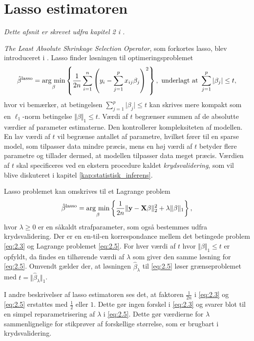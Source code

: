 \section{Lasso estimatoren} \label{sec:lasso_estimatoren}
\textit{Dette afsnit er skrevet udfra kapitel 2 i \citep{hastie}.}

\textit{The Least Absolute Shrinkage Selection Operator}, som forkortes lasso, blev introduceret i \citep{lasso}. 
Lasso finder løsningen til optimeringsproblemet
\begin{align}
\hat{\beta}^\text{lasso} = \argmin_{\beta} \cbr{\frac{1}{2n} \sum_{i=1}^n \del{y_i - \sum_{j=1}^p x_{ij} \beta_j}^2}, \ \text{underlagt at } \sum_{j=1}^p \vert \beta_j \vert \leq t, \label{eq:2.3}
\end{align} 
hvor vi bemærker, at betingelsen $\sum_{j=1}^p \vert \beta_j \vert \leq t$ kan skrives mere kompakt som en \(\ell_1\)-norm betingelse $\Vert \beta \Vert_1 \leq t$.
Værdi af \(t\) begrænser summen af de absolutte værdier af parameter estimaterne.
Den kontrollerer kompleksiteten af modellen. 
En lav værdi af \(t\) vil begrænse antallet af parametre, hvilket fører til en sparse model, som tilpasser data mindre præcis, mens en høj værdi af \(t\) betyder flere parametre og tillader dermed, at modellen tilpasser data meget præcis.
Værdien af \(t\) skal specificeres ved en ekstern procedure kaldet \textit{krydsvalidering}, som vil blive diskuteret i kapitel \ref{kap:statistisk_inferens}.

Lasso problemet kan omskrives til et Lagrange problem
\begin{align}
\hat{\beta}^\text{lasso} = \argmin_{\beta} \cbr{\frac{1}{2n} \Vert \y - \X \beta \Vert_2^2 + \lambda \Vert \beta \Vert_1}, \label{eq:2.5}
\end{align}
hvor $\lambda \geq 0$ er en såkaldt strafparameter, som også bestemmes udfra krydsvalidering. 
Der er en en-til-en korrespondance mellem det betingede problem \eqref{eq:2.3} og Lagrange problemet \eqref{eq:2.5}. 
For hver værdi af \(t\) hvor \(\Vert \beta \Vert_1 \leq t\) er opfyldt, da findes en tilhørende værdi af $\lambda$ som giver den samme løsning for \eqref{eq:2.5}.
Omvendt gælder der, at løsningen $\hat{\beta}_\lambda$ til \eqref{eq:2.5} løser grænseproblemet med $t=\Vert \hat{\beta}_\lambda \Vert_1$.

I andre beskrivelser af lasso estimatoren ses det, at faktoren \(\frac{1}{2n}\) i \eqref{eq:2.3} og \eqref{eq:2.5} erstattes med \(\frac{1}{2}\) eller \(1\).
Dette gør ingen forskel i \eqref{eq:2.3} og svarer blot til en simpel reparametrisering af \(\lambda\) i \eqref{eq:2.5}.
Dette gør værdierne for \(\lambda\) sammenlignelige for stikprøver af forskellige størrelse, som er brugbart i krydsvalidering.

